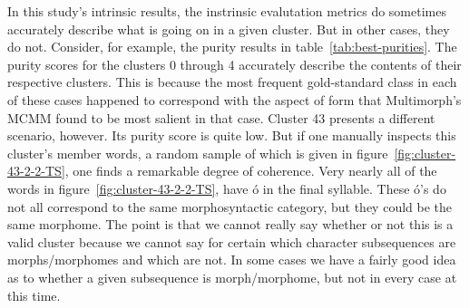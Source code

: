 In this study's intrinsic results, the instrinsic evalutation metrics do sometimes accurately describe what is going on in a given cluster. But in other cases, they do not. Consider, for example, the purity results in table~\ref{tab:best-purities}. The purity scores for the clusters 0 through 4 accurately describe the contents of their respective clusters. This is because the most frequent gold-standard class in each of these cases happened to correspond with the aspect of form that Multimorph's MCMM found to be most salient in that case.
Cluster 43 presents a different scenario, however. Its purity score is quite low. But if one manually inspects this cluster's member words, a random sample of which is given in figure~\ref{fig:cluster-43-2-2-TS}, one finds a remarkable degree of coherence. Very nearly all of the words in 
figure~\ref{fig:cluster-43-2-2-TS}, have \textsf{\'{o}} in the final syllable. These \textsf{\'{o}}'s do not all correspond to the same morphosyntactic category, but they could be the same morphome. The point is that we cannot really say whether or not this is a valid cluster because we cannot say for certain which character subsequences are morphs/morphomes and which are not. In some cases we have a fairly good idea as to whether a given subsequence is morph/morphome, but not in every case at this time.
